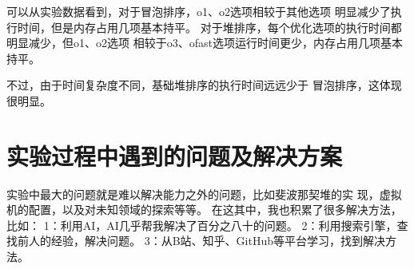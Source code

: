 \documentclass[UTF8]{ctexart}
\begin{document}
可以从实验数据看到，对于冒泡排序，o1、o2选项相较于其他选项
明显减少了执行时间，但是内存占用几项基本持平。
对于堆排序，每个优化选项的执行时间都明显减少，但o1、o2选项
相较于o3、ofast选项运行时间更少，内存占用几项基本持平。

不过，由于时间复杂度不同，基础堆排序的执行时间远远少于
冒泡排序，这体现很明显。

\section{实验过程中遇到的问题及解决方案}
实验中最大的问题就是难以解决能力之外的问题，比如斐波那契堆的实
现，虚拟机的配置，以及对未知领域的探索等等。
在这其中，我也积累了很多解决方法，比如：
1：利用AI，AI几乎帮我解决了百分之八十的问题。
2：利用搜索引擎，查找前人的经验，解决问题。
3：从B站、知乎、GitHub等平台学习，找到解决方法。
\end{document}
